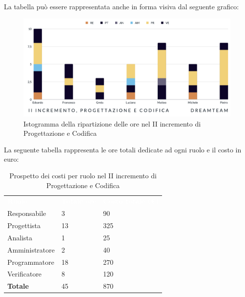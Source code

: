 La tabella può essere rappresentata anche in forma visiva dal seguente grafico:
\begin{figure}[H]
\centering
\includegraphics[scale=0.50]{Sezioni/SezioniPreventivo/grafici/progettazione/Progettazione_II_incremento.png}
\caption{Istogramma della ripartizione delle ore nel II incremento di Progettazione e Codifica}
\end{figure}

La seguente tabella rappresenta le ore totali dedicate ad ogni ruolo e il costo in euro:

\begin{table}[H]
\begin{center}
\renewcommand{\arraystretch}{1.5}
\begin{tabular}{ m{}<{\centering}  m{}<{\centering} m{}<{\centering}}
	\rowcolor{darkblue}
	\textcolor{white}{\textbf{Ruolo}}&\textcolor{white}{\textbf{Totale ore}}&\textcolor{white}{\textbf{Costo totale (\euro)}}\\ 

	Responsabile & 3 & 90 \\	
	
	Progettista & 13 & 325 \\
	
	Analista & 1 & 25 \\

	Amministratore & 2 & 40 \\
	
	Programmatore & 18 & 270 \\
	
	Verificatore & 8 & 120 \\
	
	\textbf{Totale} & 45 & 870 \\
	
\end{tabular}
\caption{Prospetto dei costi per ruolo nel II incremento di Progettazione e Codifica}
\end{center}
\end{table}

